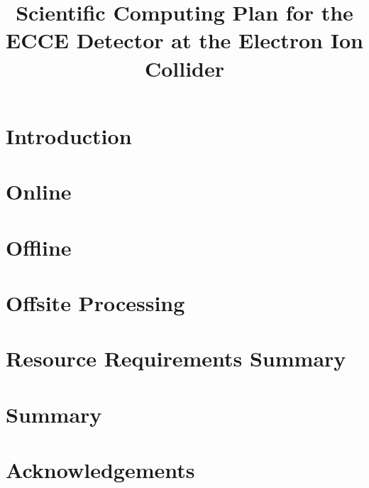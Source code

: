 \documentclass[longtitle,preprint,5p,times,twocolumn]{elsarticle}
\begin{document}
\begin{frontmatter}
\title{Scientific Computing Plan for the ECCE Detector at the Electron Ion Collider}
\def\theaffn{\arabic{affn}} %



\end{frontmatter}

\setcounter{tocdepth}{1}
\tableofcontents


\section {Introduction}
\label{sec:introduction}



\section {Online}
\label{sec:online}



\section {Offline}
\label{sec:offline}


\section {Offsite Processing}
\label{sec:offsite}


\section {Resource Requirements Summary}
\label{sec:resources}



\section{Summary}
\label{sec:executive_summary}


\section{Acknowledgements}
\label{acknowledgements}


%


%

%


 

\end{document}
